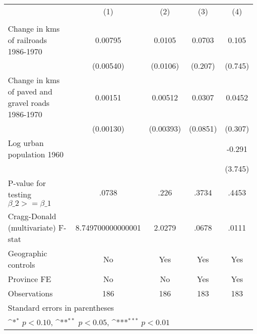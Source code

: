 {
\def\sym#1{\ifmmode^{#1}\else\(^{#1}\)\fi}
\begin{tabular}{l*{4}{c}}
\hline\hline
                &\multicolumn{1}{c}{(1)}&\multicolumn{1}{c}{(2)}&\multicolumn{1}{c}{(3)}&\multicolumn{1}{c}{(4)}\\
                &\multicolumn{1}{c}{}&\multicolumn{1}{c}{}&\multicolumn{1}{c}{}&\multicolumn{1}{c}{}\\
\hline
Change in kms of railroads 1986-1970&  0.00795         &   0.0105         &   0.0703         &    0.105         \\
                &(0.00540)         & (0.0106)         &  (0.207)         &  (0.745)         \\
[1em]
Change in kms of paved and gravel roads 1986-1970&  0.00151         &  0.00512         &   0.0307         &   0.0452         \\
                &(0.00130)         &(0.00393)         & (0.0851)         &  (0.307)         \\
[1em]
Log urban population 1960&                  &                  &                  &   -0.291         \\
                &                  &                  &                  &  (3.745)         \\
\hline
P-value for testing $\beta\_{2} >= \beta\_{1}$&    .0738         &     .226         &    .3734         &    .4453         \\
Cragg-Donald (multivariate) F-stat&8.749700000000001         &   2.0279         &    .0678         &    .0111         \\
Geographic controls&       No         &      Yes         &      Yes         &      Yes         \\
Province FE     &       No         &       No         &      Yes         &      Yes         \\
Observations    &      186         &      186         &      183         &      183         \\
\hline\hline
\multicolumn{5}{l}{\footnotesize Standard errors in parentheses}\\
\multicolumn{5}{l}{\footnotesize \sym{*} \(p<0.10\), \sym{**} \(p<0.05\), \sym{***} \(p<0.01\)}\\
\end{tabular}
}
